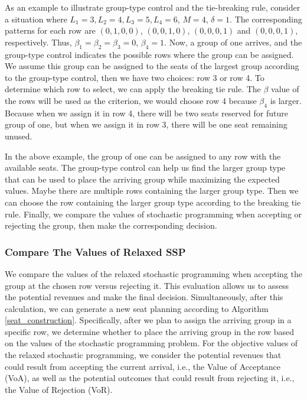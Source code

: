 As an example to illustrate group-type control and the tie-breaking rule, consider a situation where $L_1 =3, L_2 = 4, L_3 =5, L_4 =6$, $M =4$, $\delta =1$. The corresponding patterns for each row are $(0,1,0,0)$, $(0,0,1,0)$, $(0,0,0,1)$ and $(0,0,0,1)$, respectively. Thus, $\beta_1 = \beta_2 = \beta_3 =0$, $\beta_4 =1$. Now, a group of one arrives, and the group-type control indicates the possible rows where the group can be assigned. We assume this group can be assigned to the seats of the largest group according to the group-type control, then we have two choices: row 3 or row 4. To determine which row to select, we can apply the breaking tie rule. The $\beta$ value of the rows will be used as the criterion, we would choose row 4 because $\beta_4$ is larger. Because when we assign it in row 4, there will be two seats reserved for future group of one, but when we assign it in row 3, there will be one seat remaining unused.

In the above example, the group of one can be assigned to any row with the available seats. The group-type control can help us find the larger group type that can be used to place the arriving group while maximizing the expected values. Maybe there are multiple rows containing the larger group type. Then we can choose the row containing the larger group type according to the breaking tie rule. 
Finally, we compare the values of stochastic programming when accepting or rejecting the group, then make the corresponding decision.



\subsubsection*{Compare The Values of Relaxed SSP}
We compare the values of the relaxed stochastic programming when accepting the group at the chosen row versus rejecting it. This evaluation allows us to assess the potential revenues and make the final decision. Simultaneously, after this calculation, we can generate a new seat planning according to Algorithm \ref{seat_construction}. Specifically, after we plan to assign the arriving group in a specific row, we determine whether to place the arriving group in the row based on the values of the stochastic programming problem. For the objective values of the relaxed stochastic programming, we consider the potential revenues that could result from accepting the current arrival, i.e., the Value of Acceptance (VoA), as well as the potential outcomes that could result from rejecting it, i.e., the Value of Rejection (VoR).

